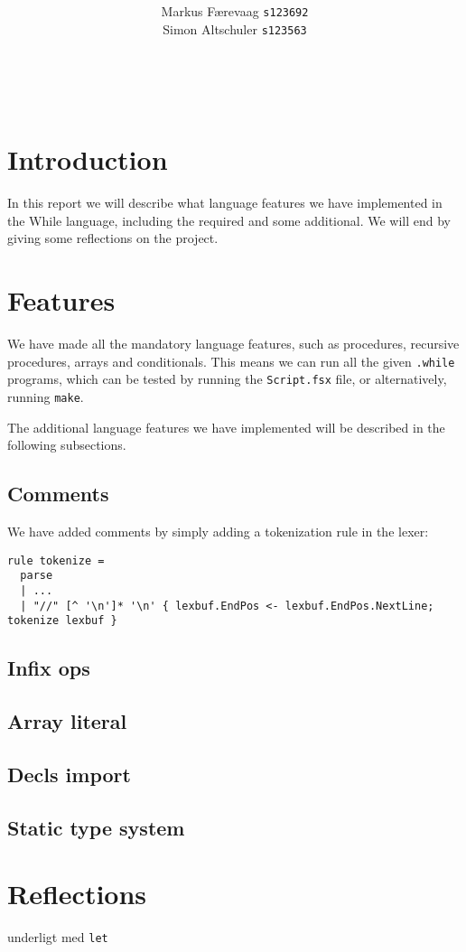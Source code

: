\documentclass{article}
\title{\TITLE\\ {\large \COURSE}}
\date{\DATE}
\author{
  Markus Færevaag {\tt s123692}\\
  Simon Altschuler {\tt s123563}
}
\begin{document}
\maketitle
\vspace{10cm}
 \\
\clearpage


\section{Introduction}
In this report we will describe what language features we have
implemented in the While language, including the required and some
additional. We will end by giving some reflections on the
project.


\section{Features}
We have made all the mandatory language features, such as procedures,
recursive procedures, arrays and conditionals. This means we can run
all the given {\tt .while} programs, which can be tested by running
the {\tt Script.fsx} file, or alternatively, running {\tt make}.

The additional language features we have implemented will be described
in the following subsections.

\subsection{Comments}
We have added comments by simply adding a tokenization rule in the
lexer:
\begin{verbatim}
rule tokenize =
  parse
  | ...
  | "//" [^ '\n']* '\n' { lexbuf.EndPos <- lexbuf.EndPos.NextLine; tokenize lexbuf }
\end{verbatim}

\subsection{Infix ops}
\subsection{Array literal}
\subsection{Decls import}
\subsection{Static type system}


\section{Reflections}
underligt med {\tt let}
\end{document}
